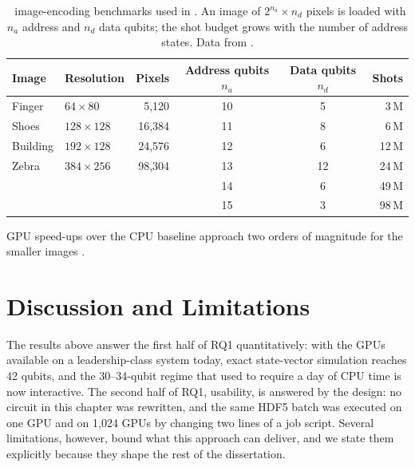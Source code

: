 \begin{table}[htbp]
\caption{\qcrank\ image-encoding benchmarks used in \cite{guo2025qgear}. An image of $2^{n_{a}}\times n_{d}$ pixels is loaded with $n_{a}$ address and $n_{d}$ data qubits; the shot budget grows with the number of address states. Data from \cite{guo2025qgear}.}
\label{tab:qgear:qcrank}
\centering\small
\begin{threeparttable}
\begin{tabular}{@{}llrccr@{}}
\toprule
Image & Resolution & Pixels & Address qubits $n_{a}$ & Data qubits $n_{d}$ & Shots \\
\midrule
Finger   & $64\times 80$   & 5,120  & 10 & 5  & 3\,M \\
Shoes    & $128\times 128$ & 16,384 & 11 & 8  & 6\,M \\
Building & $192\times 128$ & 24,576 & 12 & 6  & 12\,M \\
Zebra    & $384\times 256$ & 98,304 & 13 & 12 & 24\,M \\
         &                 &        & 14 & 6  & 49\,M \\
         &                 &        & 15 & 3  & 98\,M \\
\bottomrule
\end{tabular}
\begin{tablenotes}\footnotesize
\item GPU speed-ups over the CPU baseline approach two orders of magnitude for the smaller images \cite{guo2025qgear}.
\end{tablenotes}
\end{threeparttable}
\end{table}

\section{Discussion and Limitations}\label{sec:qgear:discussion}

The results above answer the first half of RQ1 quantitatively: with the GPUs available on a leadership-class system today, exact state-vector simulation reaches 42 qubits, and the 30--34-qubit regime that used to require a day of CPU time is now interactive. The second half of RQ1, usability, is answered by the design: no circuit in this chapter was rewritten, and the same HDF5 batch was executed on one GPU and on 1,024 GPUs by changing two lines of a job script. Several limitations, however, bound what this approach can deliver, and we state them explicitly because they shape the rest of the dissertation.

